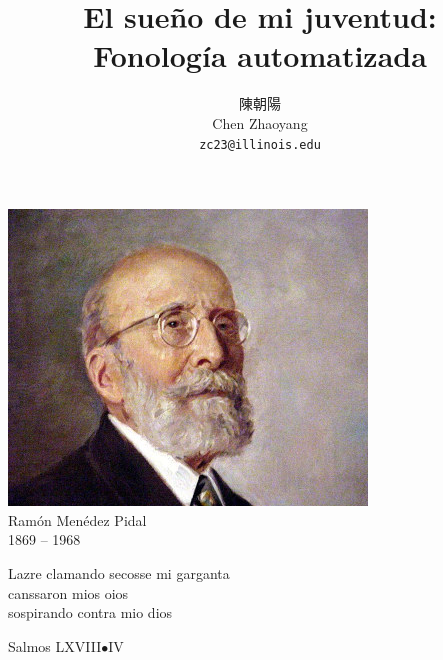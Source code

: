 \documentclass{report}[12pt]
\title{El sueño de mi juventud: \\ Fonología automatizada}
\author{陳朝陽 \\ Chen Zhaoyang \\ \texttt{zc23@illinois.edu}}
\begin{document}
\maketitle

\pagebreak

\hspace{0pt}
\vfill

\begin{center}
  \includegraphics[scale=1.25]{pidal.jpg} \\
  \vspace{0.2cm}
  \Huge{Ramón Menédez Pidal \\ 1869 -- 1968}
\end{center}

\vfill  
\hspace{0pt}

\thispagestyle{empty}

\pagebreak

\begin{abstract}
  
\end{abstract}

\pagebreak

\hspace{0pt}
\vfill

\begin{center}
  \begin{flushleft}
    Lazre clamando secosse mi garganta \\
    canssaron mios oios \\
    sospirando contra mio dios \\
  \end{flushleft}
  \vspace{0.5cm}
  \begin{flushright}
    Salmos LXVIII$\bullet$IV\footnotemark
  \end{flushright}
\end{center}
\end{document}
